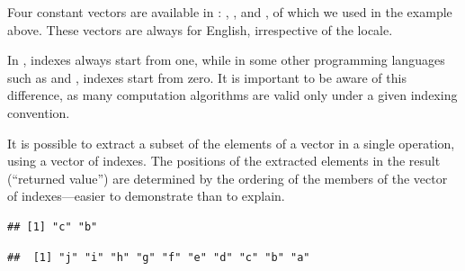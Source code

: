 \documentclass[krantz2]{krantz}\usepackage{knitr}
\begin{document}
\begin{explainbox}
Four constant vectors are available in \Rlang: , ,  and  , of which we used  in the example above. These vectors are always for English, irrespective of the locale.
\end{explainbox}

\begin{warningbox}
In \Rlang, indexes always start from one, while in some other programming languages such as \Clang and \Cpplang, indexes start from zero. It is important to be aware of this difference, as many computation algorithms are valid only under a given indexing convention.
\end{warningbox}

It is possible to extract a subset of the elements of a vector in a single operation, using a vector of indexes. The positions of the extracted elements in the result (``returned value'') are determined by the ordering of the members of the vector of indexes---easier to demonstrate than to explain.

\begin{knitrout}\footnotesize
{}\color{fgcolor}\begin{kframe}
\begin{alltt}
\hlstd{a[}\hlstd{(}\hlstd{,} \hlstd{)]}
\end{alltt}
\begin{verbatim}
## [1] "c" "b"
\end{verbatim}
\begin{alltt}
\hlstd{a[}\hlopt{:}\hlstd{]}
\end{alltt}
\begin{verbatim}
##  [1] "j" "i" "h" "g" "f" "e" "d" "c" "b" "a"
\end{verbatim}
\end{kframe}
\end{knitrout}
\end{document}
